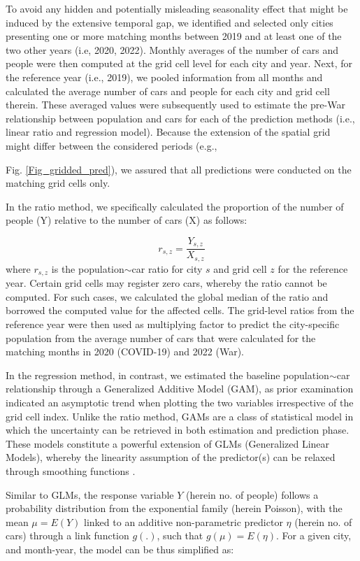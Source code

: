 \documentclass[sn-basic]{sn-jnl}%
\begin{document}
To avoid any hidden and potentially misleading seasonality effect that might be induced by the extensive temporal gap, we identified and selected only cities presenting one or more matching months between 2019 and at least one of the two other years (i.e, 2020, 2022). Monthly averages of the number of cars and people were then computed at the grid cell level for each city and year.  Next, for the reference year (i.e., 2019), we pooled information from all months and calculated the average number of cars and people for each city and grid cell therein. These averaged values were subsequently used to estimate the pre-War relationship between population and cars for each of the prediction methods (i.e., linear ratio and regression model). Because the extension of the spatial grid might differ between the considered periods (e.g., {Fig. \ref{Fig_gridded_pred}), we assured that all predictions were conducted on the matching grid cells only. 

In the ratio method, we specifically calculated the proportion of the number of people (Y) relative to the number of cars (X) as follows:

\begin{equation}
r_{s,z} = \frac{Y_{s,z}} {X_{s,z}}
\end{equation}
where $r_{s,z}$ is the population$\sim$car ratio for city $s$ and grid cell $z$ for the reference year. Certain grid cells may register zero cars, whereby the ratio cannot be computed. For such cases, we calculated the global median of the ratio and borrowed the computed value for the affected cells. The grid-level ratios from the reference year were then used as multiplying factor to predict the city-specific population from the average number of cars that were calculated for the matching months in 2020 (COVID-19) and 2022 (War). 

In the regression method, in contrast, we estimated the baseline population$\sim$car relationship through a Generalized Additive Model (GAM), as prior examination indicated an asymptotic trend when plotting the two variables irrespective of the grid cell index. Unlike the ratio method, GAMs are a class of statistical model in which the uncertainty can be retrieved in both estimation and prediction phase. These models constitute a powerful extension of GLMs (Generalized Linear Models), whereby the linearity assumption of the predictor(s) can be relaxed through smoothing functions \citep{Hastie_Tibshirani_1990}. 

Similar to GLMs, the response variable $Y$ (herein no. of people) follows a probability distribution from the exponential family (herein Poisson), with the mean $\mu = E(Y)$ linked to an additive non-parametric predictor $\eta$ (herein no. of cars) through a link function $g(.)$, such that $g(\mu) = E(\eta)$. For a given city, and month-year, the model can be thus simplified as: 

}
\end{document}
